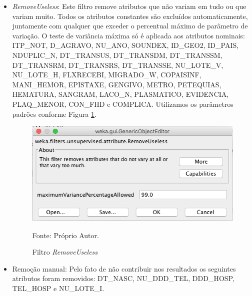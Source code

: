 \documentclass[
	12pt,				%
	openright,			%
	oneside,	
	a4paper,				%
	english,				%
	brazil				%
]{abntex2/abntex2} %
\begin{document}
		\begin{itemize}
			\item \textit{RemoveUseless}: Este filtro remove atributos que não variam em tudo ou que variam muito. Todos os atributos constantes são excluídos automaticamente, juntamente com qualquer que exceder o percentual máximo de parâmetro de variação. O teste de variância máxima só é aplicada aos atributos nominais: ITP\_NOT, D\_AGRAVO, NU\_ANO, SOUNDEX, ID\_GEO2, ID\_PAIS, NDUPLIC\_N, DT\_TRANSUS, DT\_TRANSDM, DT\_TRANSSM, DT\_TRANSRM, DT\_TRANSRS, DT\_TRANSSE, NU\_LOTE\_V, NU\_LOTE\_H, FLXRECEBI, MIGRADO\_W, COPAISINF, MANI\_HEMOR, EPISTAXE, GENGIVO, METRO, PETEQUIAS, HEMATURA, SANGRAM, LACO\_N, PLASMATICO, EVIDENCIA, PLAQ\_MENOR, CON\_FHD e  COMPLICA. Utilizamos os parâmetros padrões conforme Figura \ref{figfiltroRemoveUseless}.
			\begin{figure}[!h]
				\caption{\label{figfiltroRemoveUseless} \fontsize{10}{\baselineskip} \selectfont Filtro \textit{RemoveUseless}}
				\begin{center}
					\includegraphics[scale=0.45]{img/filtroRemoveUseless.png}
				\end{center}
				\hspace{4cm} {\fontsize{10}{\baselineskip} \selectfont Fonte: Próprio Autor.}
			\end{figure}
			
			\item Remoção manual: Pelo fato de não contribuir nos resultados os seguintes atributos foram removidos: DT\_NASC, NU\_DDD\_TEL, DDD\_HOSP, TEL\_HOSP e NU\_LOTE\_I.
			

\end{itemize}
\end{document}
